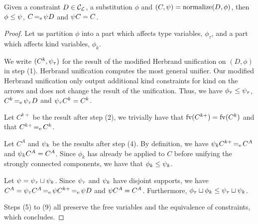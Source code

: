 \begin{lemma}
  \label{lemma:normalform}
  Given a constraint $D\in{\mathcal C_{\mathcal L}}$, a substitution $\phi$ and
  $(C,\mathrm{\psi}) = \operatorname{normalize}(D,\phi)$,
  then $\phi\leq\mathrm{\psi}$,
  $C \operatorname{=_e} \mathrm{\psi} D$ and
  $\mathrm{\psi} C = C$.
\end{lemma}
\begin{proof}
  Let us partition $\phi$ into a part which affects type variables,
  $\phi_\tau$, and a part which affects kind variables, $\phi_k$.

  We write $(C^k,\mathrm{\psi}_\tau)$ for the result of
  the modified Herbrand unification on $(D,\phi)$ in step (1).
  Herbrand unification computes the most general
  unifier. Our modified Herbrand unification only output additional
  kind constraints for kind on the arrows and does not change
  the result of the unification. Thus, we have
  $\phi_\tau\leq\mathrm{\psi}_\tau$,
  $C^k \operatorname{=_e} \mathrm{\psi}_\tau D$ and
  $\mathrm{\psi}_\tau C^k = C^k$.

  Let $C^{k+}$ be the result after step (2), we trivially have that
  $\operatorname{fv}(C^{k+}) = \operatorname{fv}(C^k)$ and that $C^{k+} \operatorname{=_e} C^k$.

  Let $C^{A}$ and $\mathrm{\psi}_k$ be the results after step (4).
  By definition, we have $\mathrm{\psi}_k C^{k+} \operatorname{=_e} C^{A}$ and
  $\mathrm{\psi}_k C^{A} = C^{A}$. Since $\phi_k$ has already be applied to $C$ before
  unifying the strongly connected components,
  we have that $\phi_k\leq\mathrm{\psi}_k$.

  Let $\mathrm{\psi} = \mathrm{\psi}_\tau \sqcup \mathrm{\psi}_k$. Since $\mathrm{\psi}_\tau$ and $\mathrm{\psi}_k$
  have disjoint supports,
  we have $C^{A} = \mathrm{\psi}_\tau C^{A} \operatorname{=_e} \mathrm{\psi} C^{k+} \operatorname{=_e} \mathrm{\psi} D$
  and $\mathrm{\psi} C^{A} = C^{A}$.
  Furthermore, $\phi_\tau \sqcup \phi_k \leq \mathrm{\psi}_\tau \sqcup \mathrm{\psi}_k$.

  Steps (5) to (9) all preserve the free variables and the equivalence
  of constraints, which concludes.
\end{proof}

